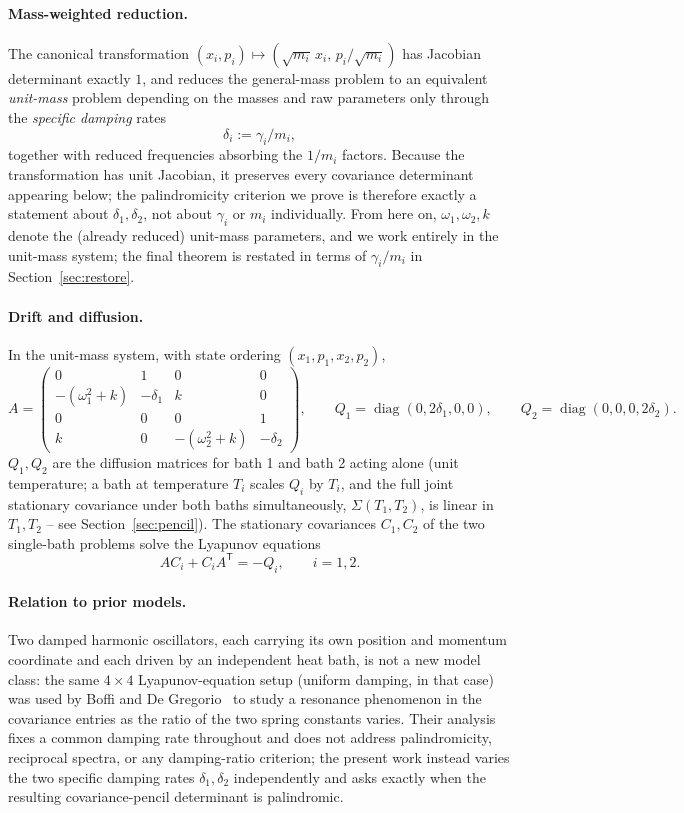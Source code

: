 \documentclass[11pt]{article}
\theoremstyle{definition}
\begin{document}
\paragraph{Mass-weighted reduction.} The canonical transformation
$(x_i,p_i)\mapsto(\sqrt{m_i}\,x_i,\,p_i/\sqrt{m_i})$ has Jacobian
determinant exactly $1$, and reduces the general-mass problem to an
equivalent \emph{unit-mass} problem depending on the masses and raw
parameters only through the \emph{specific damping} rates
\[
\delta_i := \gamma_i/m_i,
\]
together with reduced frequencies absorbing the $1/m_i$ factors. Because
the transformation has unit Jacobian, it preserves every covariance
determinant appearing below; the palindromicity criterion we prove is
therefore exactly a statement about $\delta_1,\delta_2$, not about
$\gamma_i$ or $m_i$ individually. From here on, $\omega_1,\omega_2,k$
denote the (already reduced) unit-mass parameters, and we work entirely
in the unit-mass system; the final theorem is restated in terms of
$\gamma_i/m_i$ in Section~\ref{sec:restore}.

\paragraph{Drift and diffusion.} In the unit-mass system, with state
ordering $(x_1,p_1,x_2,p_2)$,
\[
A =
\begin{pmatrix}
0 & 1 & 0 & 0\\
-(\omega_1^2+k) & -\delta_1 & k & 0\\
0 & 0 & 0 & 1\\
k & 0 & -(\omega_2^2+k) & -\delta_2
\end{pmatrix},
\qquad
Q_1 = \operatorname{diag}(0,2\delta_1,0,0),
\qquad
Q_2 = \operatorname{diag}(0,0,0,2\delta_2).
\]
$Q_1,Q_2$ are the diffusion matrices for bath 1 and bath 2 acting alone
(unit temperature; a bath at temperature $T_i$ scales $Q_i$ by $T_i$, and
the full joint stationary covariance under both baths simultaneously,
$\Sigma(T_1,T_2)$, is linear in $T_1,T_2$ -- see
Section~\ref{sec:pencil}). The stationary covariances $C_1,C_2$ of the
two single-bath problems solve the Lyapunov equations
\begin{equation}
\label{eq:lyap}
A C_i + C_i A^{\mathsf T} = -Q_i, \qquad i=1,2.
\end{equation}

\paragraph{Relation to prior models.} Two damped harmonic oscillators,
each carrying its own position and momentum coordinate and each driven by
an independent heat bath, is not a new model class: the same $4\times4$
Lyapunov-equation setup (uniform damping, in that case) was used
by Boffi and De Gregorio~\cite{boffi2024} to study a resonance phenomenon
in the covariance entries as the ratio of the two spring constants
varies. Their analysis fixes a common damping rate throughout and does
not address palindromicity, reciprocal spectra, or any damping-ratio
criterion; the present work instead varies the two specific damping
rates $\delta_1,\delta_2$ independently and asks exactly when the
resulting covariance-pencil determinant is palindromic.
\end{document}
